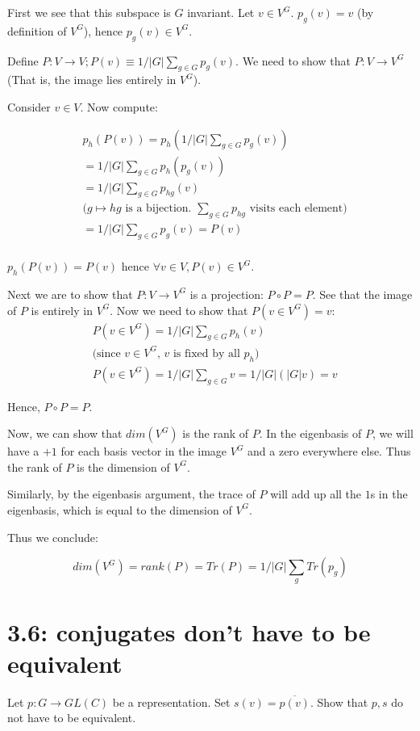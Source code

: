 \documentclass{book}
\theoremstyle{definition}
\begin{document}
First we see that this subspace is $G$ invariant. Let $v \in V^G$. $p_g(v) = v$
(by definition of $V^G$), hence $p_g(v) \in V^G$. 

Define $P: V \rightarrow V; P(v) \equiv 1/|G|\sum_{g \in G}p_g(v)$.
We need to show that $P : V \rightarrow V^G$ (That is, the image lies entirely in $V^G$).

Consider $v \in V$. Now compute:

\begin{align*}
&p_h(P(v)) = p_h(1/|G|\sum_{g \in G} p_g(v)) \\
& = 1/|G|\sum_{g \in G} p_h(p_g(v)) \\
& = 1/|G|\sum_{g \in G} p_{hg}(v) \\
& \text{($g \mapsto hg$ is a bijection. $\sum_{g \in G} p_{hg}$ visits each element)} \\
& = 1/|G|\sum_{g \in G} p_{g}(v) = P(v)\\
\end{align*}

$p_h(P(v)) = P(v)$ hence $\forall v \in V, P(v) \in V^G$.


Next we are to show that $P: V \rightarrow V^G$ is a projection: $P \circ P = P$.
See that the image of $P$ is entirely in $V^G$. Now we need to show that $P(v \in V^G) = v$:
\begin{align*}
&P(v \in V^G) = 1/|G| \sum_{g \in G} p_h(v) \\
&\text{(since $v \in V^G$, $v$ is fixed by all $p_h$)} \\
&P(v \in V^G) = 1/|G| \sum_{g \in G} v = 1/|G| (|G| v) = v
\end{align*}

Hence, $P \circ P = P$.

Now, we can show that $dim(V^G)$ is the rank of $P$. In the eigenbasis of $P$,
we will have a $+1$ for each basis vector in the image $V^G$ and a zero 
everywhere else. Thus the rank of $P$ is the dimension of $V^G$.

Similarly, by the eigenbasis argument, the trace of $P$ will add up all the $1$s
in the eigenbasis, which is equal to the dimension of $V^G$.

Thus we conclude:

$$
dim(V^G) = rank(P) = Tr(P) = 1/|G| \sum_g Tr(p_g)
$$

\section{3.6: conjugates don't have to be equivalent}
Let $p: G \rightarrow GL(C)$ be a representation. Set $s(v) = \overline{p(v)}$.
Show that $p, s$ do not have to be equivalent.
\end{document}
